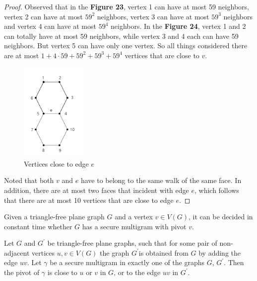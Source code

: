 \begin{proof}
    Observed that in the \textbf{Figure 23}, vertex 1 can have at most 59 neighbors, vertex 2 can have at most $59^{2}$ neighbors, vertex 3 can have at most $59^{3}$ neighbors and vertex 4 can have at most $59^{4}$ neighbors. In the \textbf{Figure 24}, vertex 1 and 2 can totally have at most 59 neighbors, while vertex 3 and 4 each can have 59 neighbors. But vertex 5 can have only one vertex. So all things considered there are at most $1 + 4 \cdot 59 + 59^{2} + 59^{3} + 59^{4}$ vertices that are close to $v$.
    \begin{figure}[H] %
    \centering %
    \includegraphics[width=0.28\textwidth]{figure/593.png} 
    \caption{Vertices close to edge $e$} %
    \label{figure} %
    \end{figure}
    Noted that both $v$ and $e$ have to belong to the same walk of the same face. In addition, there are at most two faces that incident with edge $e$, which follows that there are at most 10 vertices that are close to edge $e$.
\end{proof}

\begin{lemma}
Given a triangle-free plane graph $G$ and a vertex $v \in V(G)$, it can be decided in constant time whether $G$ has a secure multigram with pivot $v$. \cite{dvorak2013threecoloring}
\end{lemma}

\begin{lemma}
Let $G$ and $G^{'}$ be triangle-free plane graphs, such that for some pair of non-adjacent vertices $u, v \in V(G)$ the graph $G^{'}$is obtained from $G$ by adding the edge $uv$. Let $\gamma$ be a secure multigram in exactly one of the graphs $G$, $G^{'}$. Then the pivot of $\gamma$ is close to $u$ or $v$ in $G$, or to the edge $uv$ in $G^{'}$. \cite{dvorak2013threecoloring}
\end{lemma}

